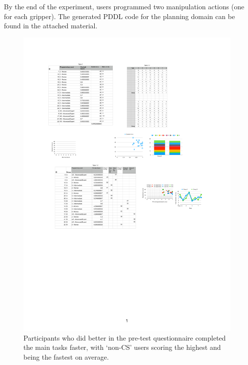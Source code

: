 %
By the end of the experiment, users programmed two manipulation actions (one for each gripper).
The generated PDDL code for the planning domain can be found in the attached material.


\begin{figure}[t]%
  \centering
    \includegraphics[width=0.5\columnwidth]{figures/quan-pretest-results.pdf}%
    \caption{Participants who did better in the pre-test questionnaire completed the main tasks faster, with `non-CS' users scoring the highest and being the fastest on average.}\label{fig:pretestvstask}%
\end{figure}%

